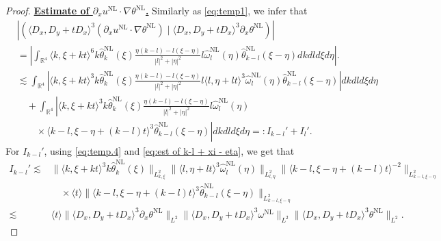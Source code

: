 \documentclass[reqno, 12pt]{amsart} %
\theoremstyle{plain} %
\theoremstyle{definition}
\theoremstyle{remark}
\numberwithin{equation}{section} %
\newcommand{\lt}{\left}
\newcommand{\rt}{\right}
\newcommand{\px}{\partial_x}
\begin{document}
\begin{proof}
		\underline{\bf Estimate of $\px u^{\mathrm{NL}} \cdot \nabla \theta^{\mathrm{NL}}$.}
		Similarly as \eqref{eq:temp1}, we infer that
		\begin{equation}\begin{aligned} \label{eq:temp4}
				& \left|\left(\langle D_x, D_y+t D_x\rangle^3\left( \px u^{\mathrm{NL}} \cdot \nabla \theta^{\mathrm{NL}}\right) \mid\langle D_x, D_y+t D_x\rangle^3 \px \theta^{\mathrm{NL}}\right)\right| \\
				&=  \left|\int_{\mathbb{R}^4}\langle k, \xi+k t\rangle^6 k \hat{\theta}_k^{\mathrm{NL}}(\xi) \frac{\eta(k-l)-l(\xi-\eta)}{|l|^2+|\eta|^2} l\hat{\omega}_l^{\mathrm{NL}}(\eta) \hat{\theta}_{k-l}^{\mathrm{NL}}(\xi-\eta) d k d l d \xi d \eta\right|. \\
				&\lesssim  \int_{\mathbb{R}^4}\left|\langle k, \xi+k t\rangle^3 k \hat{\theta}_k^{\mathrm{NL}}(\xi) \frac{\eta(k-l)-l(\xi-\eta)}{|l|^2+|\eta|^2} l \langle l, \eta+l t\rangle^3 \hat{\omega}_l^{\mathrm{NL}}(\eta)   \hat{\theta}_{k-l}^{\mathrm{NL}}(\xi-\eta) \right|d k d l d \xi d \eta \\
				& \quad + \int_{\mathbb{R}^4}\left|\langle k, \xi+k t\rangle^3 k \hat{\theta}_k^{\mathrm{NL}}(\xi) \frac{\eta(k-l)-l(\xi-\eta)}{|l|^2+|\eta|^2} l\hat{\omega}_l^{\mathrm{NL}}(\eta) \rt.\\
				&\lt. \qquad  \times  \langle k-l, \xi-\eta+(k-l) t\rangle^3 \hat{\theta}_{k-l}^{\mathrm{NL}}(\xi-\eta)\right| d k d l d \xi d \eta  =:   I_{k-l}' +I_{l}'.
		\end{aligned}\end{equation}
		For $I_{k-l}'$, using \eqref{eq:temp.4} and \eqref{eq:est of k-l + xi - eta},
		we get that
		\begin{equation}\begin{aligned}  \label{eq:temp5}
				I_{k-l}' \lesssim & \|\langle k, \xi+k t\rangle^3 k\hat{\theta}_k^{\mathrm{NL}}(\xi)\|_{L_{k, \xi}^2}\|\langle l, \eta+l t\rangle^3  \hat{\omega}_l^{\mathrm{NL}}(\eta)\|_{L_{l, \eta}^2}  \|\langle k-l, \xi-\eta+(k-l) t\rangle^{-2}\|_{L_{k-l, \xi-\eta}^2} \\
				& \quad \times \langle t\rangle \|\langle k-l, \xi-\eta+(k-l) t\rangle^3 \hat{\theta}_{k-l}^{\mathrm{NL}}(\xi-\eta)\|_{L_{k-l, \xi-\eta}^2} \\
				\lesssim & \langle t\rangle  \|\langle D_x, D_y+t D_x\rangle^3 \px \theta^{\mathrm{NL}}\|_{L^2}  \|\langle D_x, D_y+t D_x\rangle^3   \omega^{\mathrm{NL}}\|_{L^2}     \|\langle D_x, D_y+t D_x\rangle^3 \theta^{\mathrm{NL}}\|_{L^2}.
		\end{aligned}\end{equation}

\end{proof}
\end{document}
